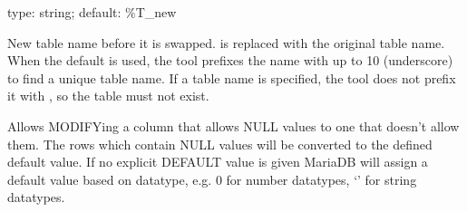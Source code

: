\documentclass[letterpaper,10pt,english]{sphinxmanual}
\begin{document}
\begin{fulllineitems}
\label{\detokenize{mariadb-schema-change:cmdoption-mariadb-schema-change-new-table-name}}
\sphinxAtStartPar
type: string; default: \%T\_new

\sphinxAtStartPar
New table name before it is swapped.   is replaced with the original
table name.  When the default is used, the tool prefixes the name with up
to 10 \sphinxcode{\sphinxupquote{\_}} (underscore) to find a unique table name.  If a table name is
specified, the tool does not prefix it with \sphinxcode{\sphinxupquote{\_}}, so the table must not
exist.

\end{fulllineitems}


\begin{fulllineitems}
\label{\detokenize{mariadb-schema-change:cmdoption-mariadb-schema-change-null-to-not-null}}
\sphinxAtStartPar
Allows MODIFYing a column that allows NULL values to one that doesn’t allow
them. The rows which contain NULL values will be converted to the defined
default value. If no explicit DEFAULT value is given MariaDB will assign a default
value based on datatype, e.g. 0 for number datatypes, ‘’ for string datatypes.

\end{fulllineitems}

\end{document}
